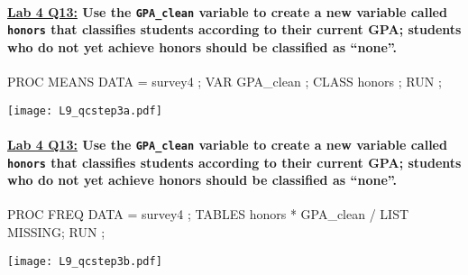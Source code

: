 \begin{frame}[fragile]
\framesubtitle{\underline{Lab 4 Q13:} Use the \texttt{GPA\_clean} variable to create a new variable called \texttt{honors} that classifies students according to their current GPA; students who do not yet achieve honors should be classified as ``none''.}
\footnotesize
\begin{code}{.0}
PROC MEANS DATA = survey4 ;
   VAR GPA_clean ;
   CLASS honors ;
RUN ;
\end{code}
\emp
{} \hspace{1in} \emp
{}
\texttt{[image: L9\_qcstep3a.pdf]}
\emp
\end{frame}

\begin{frame}[fragile]
\framesubtitle{\underline{Lab 4 Q13:} Use the \texttt{GPA\_clean} variable to create a new variable called \texttt{honors} that classifies students according to their current GPA; students who do not yet achieve honors should be classified as ``none''.}
\footnotesize
\begin{code}{.0}
PROC FREQ DATA = survey4 ;
  TABLES honors * GPA_clean /
  LIST MISSING;
RUN ;
\end{code}
\emp
{} \hspace{1in} \emp
{}
\texttt{[image: L9\_qcstep3b.pdf]}
\emp
\end{frame}

 